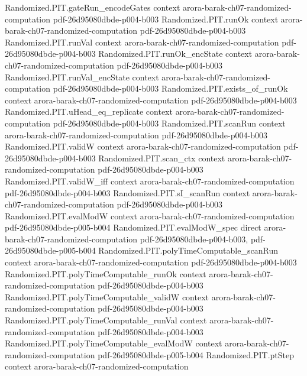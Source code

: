 \begin{theorem}
  {Randomized.PIT.gateRun_encodeGates}
  {context}
  {arora-barak-ch07-randomized-computation}
  {pdf-26d95080dbde-p004-b003}
\proofstep
  {Randomized.PIT.runOk}
  {context}
  {arora-barak-ch07-randomized-computation}
  {pdf-26d95080dbde-p004-b003}
\proofstep
  {Randomized.PIT.runVal}
  {context}
  {arora-barak-ch07-randomized-computation}
  {pdf-26d95080dbde-p004-b003}
\proofstep
  {Randomized.PIT.runOk_encState}
  {context}
  {arora-barak-ch07-randomized-computation}
  {pdf-26d95080dbde-p004-b003}
\proofstep
  {Randomized.PIT.runVal_encState}
  {context}
  {arora-barak-ch07-randomized-computation}
  {pdf-26d95080dbde-p004-b003}
\proofstep
  {Randomized.PIT.exists_of_runOk}
  {context}
  {arora-barak-ch07-randomized-computation}
  {pdf-26d95080dbde-p004-b003}
\proofstep
  {Randomized.PIT.uHead_eq_replicate}
  {context}
  {arora-barak-ch07-randomized-computation}
  {pdf-26d95080dbde-p004-b003}
\proofstep
  {Randomized.PIT.scanRun}
  {context}
  {arora-barak-ch07-randomized-computation}
  {pdf-26d95080dbde-p004-b003}
\proofstep
  {Randomized.PIT.validW}
  {context}
  {arora-barak-ch07-randomized-computation}
  {pdf-26d95080dbde-p004-b003}
\proofstep
  {Randomized.PIT.scan_ctx}
  {context}
  {arora-barak-ch07-randomized-computation}
  {pdf-26d95080dbde-p004-b003}
\proofstep
  {Randomized.PIT.validW_iff}
  {context}
  {arora-barak-ch07-randomized-computation}
  {pdf-26d95080dbde-p004-b003}
\proofstep
  {Randomized.PIT.sI_scanRun}
  {context}
  {arora-barak-ch07-randomized-computation}
  {pdf-26d95080dbde-p004-b003}
\proofstep
  {Randomized.PIT.evalModW}
  {context}
  {arora-barak-ch07-randomized-computation}
  {pdf-26d95080dbde-p005-b004}
\proofstep
  {Randomized.PIT.evalModW_spec}
  {direct}
  {arora-barak-ch07-randomized-computation}
  {pdf-26d95080dbde-p004-b003,
    pdf-26d95080dbde-p005-b004}
\proofstep
  {Randomized.PIT.polyTimeComputable_scanRun}
  {context}
  {arora-barak-ch07-randomized-computation}
  {pdf-26d95080dbde-p004-b003}
\proofstep
  {Randomized.PIT.polyTimeComputable_runOk}
  {context}
  {arora-barak-ch07-randomized-computation}
  {pdf-26d95080dbde-p004-b003}
\proofstep
  {Randomized.PIT.polyTimeComputable_validW}
  {context}
  {arora-barak-ch07-randomized-computation}
  {pdf-26d95080dbde-p004-b003}
\proofstep
  {Randomized.PIT.polyTimeComputable_runVal}
  {context}
  {arora-barak-ch07-randomized-computation}
  {pdf-26d95080dbde-p004-b003}
\proofstep
  {Randomized.PIT.polyTimeComputable_evalModW}
  {context}
  {arora-barak-ch07-randomized-computation}
  {pdf-26d95080dbde-p005-b004}
\proofstep
  {Randomized.PIT.ptStep}
  {context}
  {arora-barak-ch07-randomized-computation}

\end{theorem}
